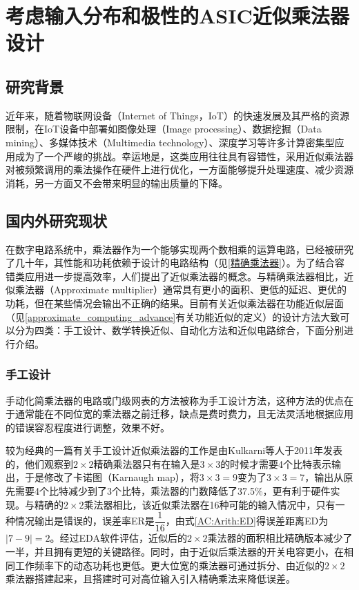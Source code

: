 \chapter{考虑输入分布和极性的ASIC近似乘法器设计}


\section{研究背景}

近年来，随着物联网设备（Internet of Things，IoT）的快速发展及其严格的资源限制，在IoT设备中部署如图像处理（Image processing）、数据挖掘（Data mining）、多媒体技术（Multimedia technology）、深度学习等许多计算密集型应用成为了一个严峻的挑战\cite{AC:AM:survey_zhuocheng}。幸运地是，这类应用往往具有容错性，采用近似乘法器对被频繁调用的乘法操作在硬件上进行优化，一方面能够提升处理速度、减少资源消耗，另一方面又不会带来明显的输出质量的下降。

\section{国内外研究现状}

在数字电路系统中，乘法器作为一个能够实现两个数相乘的运算电路，已经被研究了几十年，其性能和功耗依赖于设计的电路结构（见\ref{精确乘法器}）。为了结合容错类应用进一步提高效率，人们提出了近似乘法器的概念。与精确乘法器相比，近似乘法器（Approximate multiplier）通常具有更小的面积、更低的延迟、更优的功耗，但在某些情况会输出不正确的结果。目前有关近似乘法器在功能近似层面（见\ref{approximate_computing_advance}有关功能近似的定义）的设计方法大致可以分为四类：手工设计、数学转换近似、自动化方法和近似电路综合，下面分别进行介绍。

\subsection{手工设计}

手动化简乘法器的电路或门级网表的方法被称为手工设计方法，这种方法的优点在于通常能在不同位宽的乘法器之前迁移，缺点是费时费力，且无法灵活地根据应用的错误容忍程度进行调整，效果不好。

较为经典的一篇有关手工设计近似乘法器的工作是由Kulkarni等人\cite{AC:AM:KMap}于2011年发表的，他们观察到$2 \times 2$精确乘法器只有在输入是$3 \times 3$的时候才需要4个比特表示输出，于是修改了卡诺图（Karnaugh map），将$3 \times 3 = 9$变为了$3 \times 3 = 7$，输出从原先需要4个比特减少到了3个比特，乘法器的门数降低了37.5\%，更有利于硬件实现。与精确的$2 \times 2$乘法器相比，该近似乘法器在16种可能的输入情况中，只有一种情况输出是错误的，误差率ER是$\dfrac{1}{16}$，由式\eqref{AC:Arith:ED}得误差距离ED为$|7 − 9| = 2$。经过EDA软件评估，近似后的$2 \times 2$乘法器的面积相比精确版本减少了一半，并且拥有更短的关键路径。同时，由于近似后乘法器的开关电容更小，在相同工作频率下的动态功耗也更低。更大位宽的乘法器可通过拆分、由近似的$2 \times 2$乘法器搭建起来，且搭建时可对高位输入引入精确乘法来降低误差。

